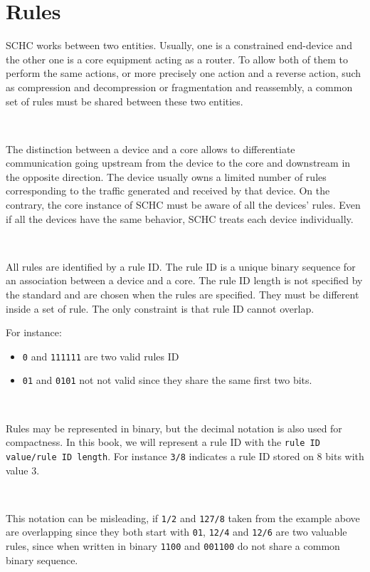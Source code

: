 
\chapter{Rules}

SCHC  works between two entities. Usually, one is a constrained end-device and the other one is a core equipment acting as a router. To allow both of them to perform the same actions, or more precisely one action and a reverse action, such as compression and decompression or fragmentation and reassembly, a common set of rules must be shared between these two entities.

~

The distinction between a device and a core allows to differentiate communication going upstream from the device to the core and downstream in the opposite direction. The device usually owns a limited number of rules corresponding to the traffic  generated and received by that device. On the contrary, the core instance of SCHC must be aware of all the devices' rules. Even if all the devices have the same behavior, SCHC treats each device individually. 

~~

All rules are identified by a rule ID. The rule ID is a unique binary sequence for an association between a device and a core. The rule ID length is not specified by the standard and are chosen when the rules are specified. They must be different inside a set of rule. The only constraint is that rule ID cannot overlap.

For instance:

\begin{itemize}
\item\texttt{0} and \texttt{111111} are two valid rules ID
\item \texttt{01} and \texttt{0101} not not valid since they share the same first two bits.
\end{itemize}

~


Rules may be represented in binary, but the decimal notation is also used for compactness. In this book, we will represent a rule ID with the \texttt{rule ID value/rule ID length}. For instance \texttt{3/8} indicates a rule ID stored on 8 bits with value 3.

~

This notation can be misleading, if \texttt{1/2} and \texttt{127/8} taken from the example above are overlapping since they both start with \texttt{01}, \texttt{12/4} and \texttt{12/6} are two valuable rules, since when written in binary \texttt{1100} and \texttt{001100} do not share a common binary sequence.

